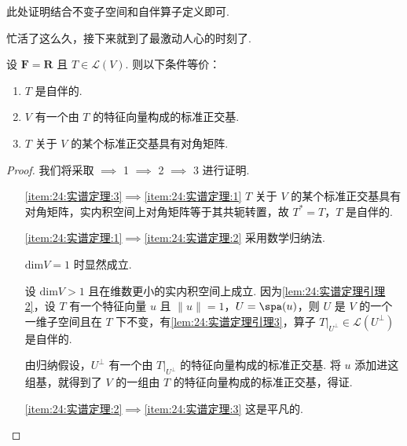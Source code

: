 此处证明结合不变子空间和自伴算子定义即可.

忙活了这么久，接下来就到了最激动人心的时刻了.

\begin{theorem}[实谱定理] \label{thm:24:实谱定理} 
    设 $ \mathbf{F} = \mathbf{R} $ 且 $ T \in \mathcal{L}(V) $. 则以下条件等价：
    \begin{enumerate}
        \item \label{item:24:实谱定理:1}
              $ T $ 是自伴的.

        \item \label{item:24:实谱定理:2}
              $ V $ 有一个由 $ T $ 的特征向量构成的标准正交基.

        \item \label{item:24:实谱定理:3}
              $ T $ 关于 $ V $ 的某个标准正交基具有对角矩阵.
    \end{enumerate}
\end{theorem}

\begin{proof}
    我们将采取 $\implies$ 1 $\implies$ 2 $\implies$ 3 进行证明.

    \begin{itemize}
        \item[\ref*{item:24:实谱定理:3}$\implies$\ref*{item:24:实谱定理:1}] $ T $ 关于 $ V $ 的某个标准正交基具有对角矩阵，实内积空间上对角矩阵等于其共轭转置，故 $ T^* = T $，$ T $ 是自伴的.

        \item[\ref*{item:24:实谱定理:1}$\implies$\ref*{item:24:实谱定理:2}] 采用数学归纳法.

            $ \mathrm{dim}V = 1 $ 时显然成立.

            设 $ \mathrm{dim}V > 1 $ 且在维数更小的实内积空间上成立. 因为\autoref{lem:24:实谱定理引理2}，设 $ T $ 有一个特征向量 $ u $ 且 $ \lVert u \rVert = 1 $，$ U = \spa(u) $，则 $ U $ 是 $ V $ 的一个一维子空间且在 $ T $ 下不变，有\autoref{lem:24:实谱定理引理3}，算子 $ T|_{U^{\perp }} \in \mathcal{L}(U^{\perp }) $ 是自伴的.

            由归纳假设，$ U^{\perp } $ 有一个由 $ T|_{U^{\perp }} $ 的特征向量构成的标准正交基. 将 $ u $ 添加进这组基，就得到了 $ V $ 的一组由 $ T $ 的特征向量构成的标准正交基，得证.

        \item[\ref*{item:24:实谱定理:2}$\implies$\ref*{item:24:实谱定理:3}] 这是平凡的.
    \end{itemize}
\end{proof}

